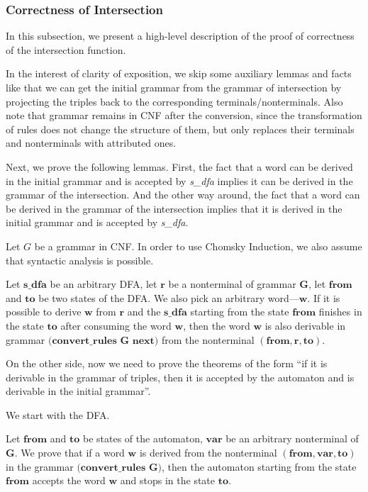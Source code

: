 \subsubsection{Correctness of Intersection}
\label{sec:correctintersection}

In this subsection, we present a high-level description of the proof of correctness of the intersection function.

In the interest of clarity of exposition, we skip some auxiliary lemmas and facts like that we can get the initial grammar from the grammar of intersection by projecting the triples back to the corresponding terminals/nonterminals. Also note that grammar remains in CNF after the conversion, since the transformation of rules does not change the structure of them, but only replaces their terminals and nonterminals with attributed ones.

Next, we prove the following lemmas. First, the fact that a word can be derived in the initial grammar and is accepted by \textit{s\_dfa} implies it can be derived in the grammar of the intersection. And the other way around, the fact that a word can be derived in the grammar of the intersection implies that it is derived in the initial grammar and is accepted by \textit{s\_dfa}.

Let $G$ be a grammar in CNF. In order to use Chomsky Induction, we also assume that syntactic analysis is possible.

\begin{theorem}
    Let $ \textbf{s\_dfa} $ be an arbitrary DFA, let $\textbf{r}$ be a nonterminal of grammar $\textbf{G}$, let $ \textbf{from} $ and $ \textbf{to} $ be two states of the DFA. We also pick an arbitrary word---$\textbf{w}$. If it is possible to derive $\textbf{w}$ from $\textbf{r}$ and the $ \textbf{s\_dfa} $ starting from the state $ \textbf{from} $ finishes in the state $ \textbf{to} $ after consuming the word $\textbf{w}$, then the word $\textbf{w}$ is also derivable in grammar
    $ \textbf{(convert\_rules~G~next}) $ from the nonterminal $(\textbf{from}, \textbf{r}, \textbf{to})$.
\end{theorem}

On the other side, now we need to prove the theorems of the form  ``if it is derivable in the grammar of triples, then it is accepted by the automaton and is derivable in the initial grammar''.

We start with the DFA.

\begin{theorem}
	Let $ \textbf{from} $ and $ \textbf{to} $ be states of the automaton, $ \textbf{var} $ be an arbitrary nonterminal of $\textbf{G}$. We prove that if a word $\textbf{w}$ is derived from the nonterminal $ (\textbf{from}, \textbf{var}, \textbf{to}) $ in the grammar $ \textbf{(convert\_rules~G)} $, then the automaton starting from the state $ \textbf{from} $ accepts the word $\textbf{w}$ and stops in the state $\textbf{to} $.
\end{theorem}

